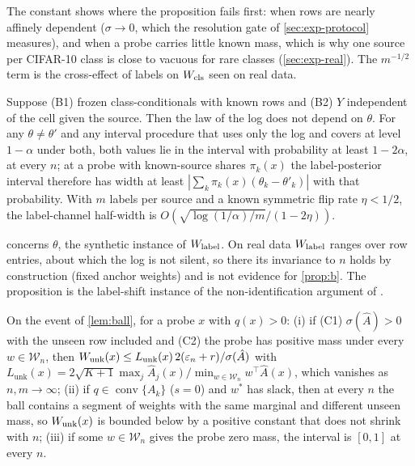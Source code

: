 The constant shows where the proposition fails first: when rows are nearly affinely dependent
($\sigma\to0$, which the resolution gate of \cref{sec:exp-protocol} measures), and when a probe
carries little known mass, which is why one source per CIFAR-10 class is close to vacuous for rare
classes (\cref{sec:exp-real}). The $m^{-1/2}$ term is the cross-effect of labels on $W_{\mathrm{cls}}$ seen on
real data.

\begin{proposition}
\label{prop:b}
Suppose (B1) frozen class-conditionals with known rows and (B2) $Y$ independent of the cell given the
source. Then the law of the log does not depend on $\theta$. For any $\theta\neq\theta'$ and any
interval procedure that uses only the log and covers at level $1-\alpha$ under both, both values lie
in the interval with probability at least $1-2\alpha$, at every $n$; at a probe with known-source
shares $\pi_k(x)$ the label-posterior interval therefore has width at least
$|\sum_k\pi_k(x)(\theta_k-\theta'_k)|$ with that probability. With $m$ labels per source and a known
symmetric flip rate $\eta<1/2$, the label-channel half-width is $O(\sqrt{\log(1/\alpha)/m}/(1-2\eta))$.
\end{proposition}

 concerns $\theta$, the synthetic instance of $W_{\mathrm{label}}$. On real data $W_{\mathrm{label}}$ ranges over
row entries, about which the log is not silent, so there its invariance to $n$ holds by
construction (fixed anchor weights) and is not evidence for \cref{prop:b}. The proposition is the
label-shift instance of the non-identification argument of \citet{young2026epistemic}.

\begin{proposition}
\label{prop:c}
On the event of \cref{lem:ball}, for a probe $x$ with $q(x)>0$:
(i) if (C1) $\sigma(\hat A)>0$ with the unseen row included and (C2) the probe has positive mass under
every $w\in\mathcal W_n$, then $W_{\mathrm{unk}}(x)\le L_{\mathrm{unk}}(x)\,2(\varepsilon_n+r)/\sigma(\hat A)$ with
$L_{\mathrm{unk}}(x)=2\sqrt{K+1}\max_{j}\hat A_j(x)/\min_{w\in\mathcal W_n}w^{\top}\hat A(x)$, which
vanishes as $n,m\to\infty$;
(ii) if $q\in\operatorname{conv}\{A_k\}$ ($s=0$) and $w^{*}$ has slack, then at every $n$ the ball
contains a segment of weights with the same marginal and different unseen mass, so $W_{\mathrm{unk}}(x)$ is
bounded below by a positive constant that does not shrink with $n$;
(iii) if some $w\in\mathcal W_n$ gives the probe zero mass, the interval is $[0,1]$ at every $n$.
\end{proposition}

